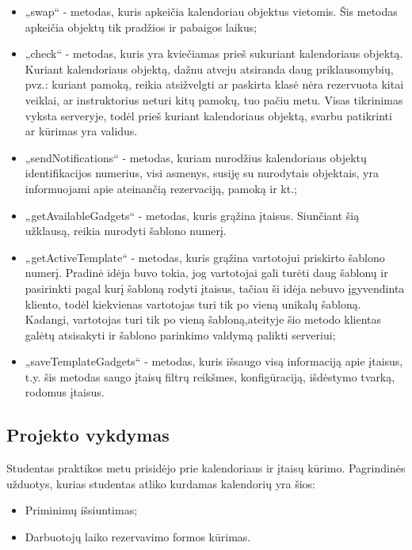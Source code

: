\documentclass{VUMIFPSbakalaurinis}
\begin{document}
\begin{itemize}
    \item „swap“ - metodas, kuris apkeičia kalendoriau objektus vietomis. Šis metodas apkeičia objektų tik pradžios ir pabaigos laikus;
    \item „check“ - metodas, kuris yra kviečiamas prieš sukuriant kalendoriaus objektą. Kuriant kalendoriaus objektą, dažnu atveju atsiranda daug priklausomybių, pvz.: kuriant pamoką, reikia atsižvelgti ar paskirta klasė nėra rezervuota kitai veiklai, ar instruktorius neturi kitų pamokų, tuo pačiu metu. Visas tikrinimas vyksta serveryje, todėl prieš kuriant kalendoriaus objektą, svarbu patikrinti ar kūrimas yra validus.
    \item „sendNotifications“ - metodas, kuriam nurodžius kalendoriaus objektų identifikacijos numerius, visi asmenys, susiję su nurodytais objektais, yra informuojami apie ateinančią rezervaciją, pamoką ir kt.;
    \item „getAvailableGadgets“ - metodas, kuris grąžina įtaisus. Siunčiant šią užklausą, reikia nurodyti šablono numerį.
    \item „getActiveTemplate“ - metodas, kuris grąžina vartotojui priskirto šablono numerį. Pradinė idėja buvo tokia, jog vartotojai gali turėti daug šablonų ir pasirinkti pagal kurį šabloną rodyti įtaisus, tačiau ši idėja nebuvo įgyvendinta kliento, todėl kiekvienas vartotojas turi tik po vieną unikalų šabloną. Kadangi, vartotojas turi tik po vieną šabloną,ateityje šio metodo klientas galėtų atsisakyti ir šablono parinkimo valdymą palikti serveriui;
    \item 
    „saveTemplateGadgets“ - metodas, kuris išsaugo visą informaciją apie įtaisus, t.y. šis metodas saugo įtaisų filtrų reikšmes, konfigūraciją, išdėstymo tvarką, rodomus įtaisus.
\end{itemize}

\subsection{Projekto vykdymas}

Studentas praktikos metu prisidėjo prie kalendoriaus ir įtaisų kūrimo. Pagrindinės užduotys, kurias studentas atliko kurdamas kalendorių yra šios: 
\begin{itemize}
    \item Priminimų išsiuntimas;
    \item Darbuotojų laiko rezervavimo formos kūrimas.
\end{itemize}
\end{document}
